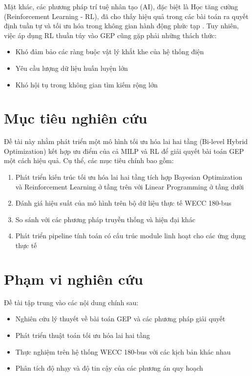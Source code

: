 Mặt khác, các phương pháp trí tuệ nhân tạo (AI), đặc biệt là Học tăng cường (Reinforcement Learning - RL), đã cho thấy hiệu quả trong các bài toán ra quyết định tuần tự và tối ưu hóa trong không gian hành động phức tạp \cite{sutton2018rl,schulman2017ppo,haarnoja2018sac}. Tuy nhiên, việc áp dụng RL thuần túy vào GEP cũng gặp phải những thách thức:

\begin{itemize}
    \item Khó đảm bảo các ràng buộc vật lý khắt khe của hệ thống điện
    \item Yêu cầu lượng dữ liệu huấn luyện lớn
    \item Khó hội tụ trong không gian tìm kiếm rộng lớn
\end{itemize}

\section{Mục tiêu nghiên cứu}

Đề tài này nhằm phát triển một mô hình tối ưu hóa lai hai tầng (Bi-level Hybrid Optimization) kết hợp ưu điểm của cả MILP và RL để giải quyết bài toán GEP một cách hiệu quả. Cụ thể, các mục tiêu chính bao gồm:

\begin{enumerate}
    \item Phát triển kiến trúc tối ưu hóa lai hai tầng tích hợp Bayesian Optimization và Reinforcement Learning ở tầng trên với Linear Programming ở tầng dưới \cite{shahriari2016bo_survey,sutton2018rl}
    \item Đánh giá hiệu suất của mô hình trên bộ dữ liệu thực tế WECC 180-bus \cite{zhang2023dataset}
    \item So sánh với các phương pháp truyền thống và hiện đại khác
    \item Phát triển pipeline tính toán có cấu trúc module linh hoạt cho các ứng dụng thực tế
\end{enumerate}

\section{Phạm vi nghiên cứu}

Đề tài tập trung vào các nội dung chính sau:

\begin{itemize}
    \item Nghiên cứu lý thuyết về bài toán GEP và các phương pháp giải quyết \cite{koltsaklis2018gep,sadeghi2017gep_review}
    \item Phát triển thuật toán tối ưu hóa lai hai tầng
    \item Thực nghiệm trên hệ thống WECC 180-bus với các kịch bản khác nhau \cite{zhang2023dataset}
    \item Phân tích độ nhạy và độ tin cậy của các phương án quy hoạch
\end{itemize}
 
